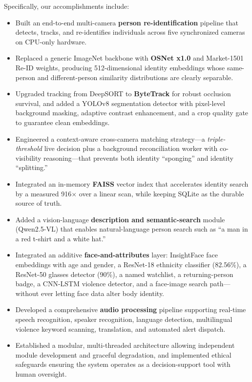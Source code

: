 \documentclass[12pt]{report}
\begin{document}
Specifically, our accomplishments include:
\begin{itemize}
    \item Built an end-to-end multi-camera \textbf{person re-identification} pipeline that detects, tracks, and re-identifies individuals across five synchronized cameras on CPU-only hardware.
    \item Replaced a generic ImageNet backbone with \textbf{OSNet x1.0} and Market-1501 Re-ID weights, producing 512-dimensional identity embeddings whose same-person and different-person similarity distributions are clearly separable.
    \item Upgraded tracking from DeepSORT to \textbf{ByteTrack} for robust occlusion survival, and added a YOLOv8 segmentation detector with pixel-level background masking, adaptive contrast enhancement, and a crop quality gate to guarantee clean embeddings.
    \item Engineered a context-aware cross-camera matching strategy---a \emph{triple-threshold} live decision plus a background reconciliation worker with co-visibility reasoning---that prevents both identity ``sponging'' and identity ``splitting.''
    \item Integrated an in-memory \textbf{FAISS} vector index that accelerates identity search by a measured 916$\times$ over a linear scan, while keeping SQLite as the durable source of truth.
    \item Added a vision-language \textbf{description and semantic-search} module (Qwen2.5-VL) that enables natural-language person search such as ``a man in a red t-shirt and a white hat.''
    \item Integrated an additive \textbf{face-and-attributes} layer: InsightFace face embeddings with age and gender, a ResNet-18 ethnicity classifier (82.56\%), a ResNet-50 glasses detector (90\%), a named watchlist, a returning-person badge, a CNN-LSTM violence detector, and a face-image search path---without ever letting face data alter body identity.
    \item Developed a comprehensive \textbf{audio processing} pipeline supporting real-time speech recognition, speaker recognition, language detection, multilingual violence keyword scanning, translation, and automated alert dispatch.
    \item Established a modular, multi-threaded architecture allowing independent module development and graceful degradation, and implemented ethical safeguards ensuring the system operates as a decision-support tool with human oversight.
\end{itemize}
\end{document}
